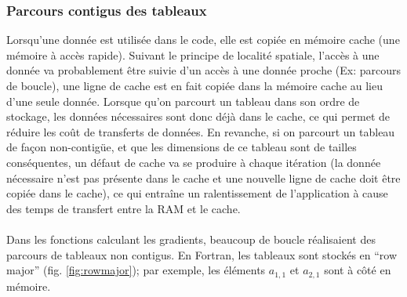 \subsubsection{Parcours contigus des tableaux}
Lorsqu'une donnée est utilisée dans le code, elle est copiée en mémoire cache (une mémoire à accès rapide). Suivant le principe de localité spatiale, l'accès à une donnée va probablement être suivie d'un accès à une donnée proche (Ex: parcours de boucle), une ligne de cache est en fait copiée dans la mémoire cache au lieu d'une seule donnée. 
Lorsque qu'on parcourt un tableau dans son ordre de stockage, les données nécessaires sont donc déjà dans le cache, ce qui permet de réduire les coût de transferts de données. En revanche, si on parcourt un tableau de façon non-contigüe, et que les dimensions de ce tableau sont de tailles conséquentes, un défaut de cache va se produire à chaque itération (la donnée nécessaire n'est pas présente dans le cache et une nouvelle ligne de cache doit être copiée dans le cache), ce qui entraîne un ralentissement de l'application à cause des temps de transfert entre la RAM et le cache.


\paragraph{}Dans les fonctions calculant les gradients, beaucoup de boucle réalisaient des parcours de tableaux non contigus. En Fortran, les tableaux sont stockés en ``row major'' (fig. \ref{fig:rowmajor}); par exemple, les éléments $a_{1,1}$ et $a_{2,1}$ sont à côté en mémoire.

